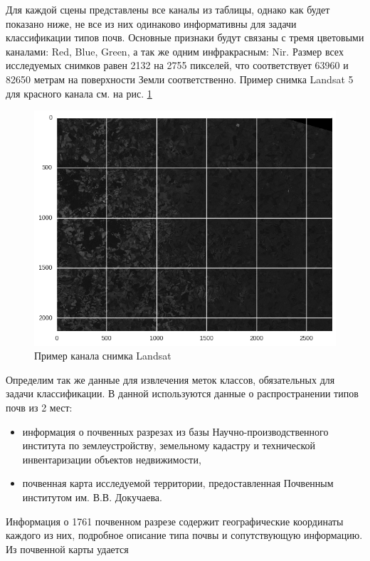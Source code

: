 \documentclass[14pt]{extarticle}
\begin{document}
\par
Для каждой сцены представлены все каналы из таблицы, однако как будет показано ниже, не 
все из них одинаково информативны для задачи классификации типов почв. Основные признаки
будут связаны с тремя цветовыми каналами: Red, Blue, Green, а так же одним инфракрасным: Nir.
Размер всех исследуемых снимков равен 2132 на 2755 пикселей, что соответствует
63960 и 82650 метрам на поверхности Земли соответственно. Пример снимка Landsat 5 для
красного канала см. на рис. \ref{image:landsat_example}
\begin{figure}[H]
\centering
\includegraphics[width=\linewidth]{imgs/landsat_example.png}
\caption{Пример канала снимка Landsat}
\label{image:landsat_example}
\end{figure}
\par
Определим так же данные для извлечения меток классов, обязательных для задачи классификации.
В данной используются данные о распространении типов почв из 2 мест:
\begin{itemize}
    \item информация о почвенных разрезах из базы Научно-производственного института по 
        землеустройству, земельному кадастру и технической инвентаризации объектов
        недвижимости,
    \item почвенная карта исследуемой территории, предоставленная Почвенным институтом
        им. В.В. Докучаева.
\end{itemize}
Информация о 1761 почвенном разрезе содержит географические координаты каждого из них,
подробное описание типа почвы и сопутствующую информацию. Из почвенной карты удается
\end{document}
